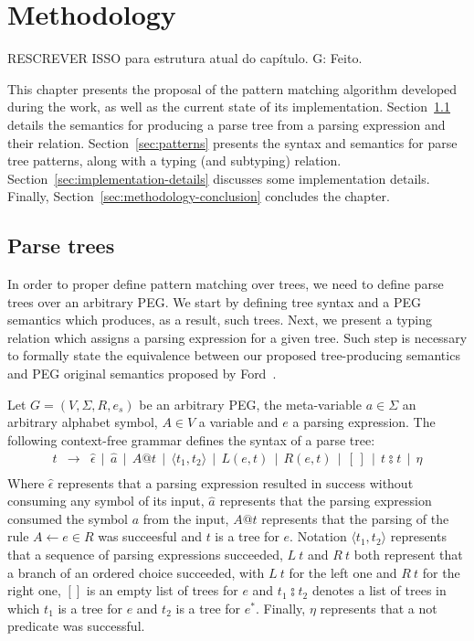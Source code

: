 \chapter{Methodology}\label{chap:methodology}

RESCREVER ISSO para estrutura atual do capítulo.
G: Feito.

This chapter presents the proposal of the pattern matching algorithm developed
during the work, as well as the  current state of its implementation.
Section~\ref{sec:parse-tress} details the semantics for producing a parse tree
from a parsing expression and their relation. Section~\ref{sec:patterns} presents 
the syntax and semantics for parse tree patterns, along with a typing (and subtyping)
relation. Section~\ref{sec:implementation-details} discusses some implementation
details. Finally, Section~\ref{sec:methodology-conclusion} concludes the chapter.

\section{Parse trees}\label{sec:parse-tress}

In order to proper define pattern matching over trees, we need
to define parse trees over an arbitrary PEG. We start by defining
tree syntax and a PEG semantics which produces, as a result, such
trees. Next, we present a typing relation which assigns a parsing
expression for a given tree. Such step is necessary to formally
state the equivalence between our proposed tree-producing semantics
and PEG original semantics proposed by Ford~\cite{ford2004-peg}.

Let \(G = (V, \Sigma, R, e_s)\) be an arbitrary PEG, the meta-variable \(a \in \Sigma\) an
arbitrary alphabet symbol, \(A \in V\) a variable and \(e\) a parsing expression.
The following context-free grammar defines the syntax of a parse tree:
\[
   \begin{array}{lcl}
      t & \to & \hat{\epsilon} \, \mid \, \hat{a} \, \mid \, A@t\,
                    \mid \, \langle t_1, t_2 \rangle\,
                    \mid \, L(e,t) \, \mid \, R(e,t) \, \mid \, [\,] \,\mid\,t \typecolon t\,
                    \mid \, \eta \\
   \end{array}
\]
Where \(\hat{\epsilon}\) represents that a parsing expression resulted in
success without consuming any symbol of its input, \(\hat{a}\) represents that
the parsing expression consumed the symbol \(a\) from the input, \(A@t\)
represents that the parsing of the rule \(A \leftarrow e \in R\) was succeesful
and $t$ is a tree for $e$. Notation
\(\langle t_1, t_2 \rangle\) represents that a sequence of parsing expressions
succeeded,
\(L \: t\) and \(R \: t\) both represent that a branch of an ordered choice succeeded,
with \(L \: t\) for the left one and \(R \: t\) for the right one,
\([]\) is an empty list of trees for $e$ and \(t_1  \typecolon  t_2\) denotes a list of
trees in which $t_1$ is a tree for $e$ and $t_2$ is a tree for $e^*$. Finally,
\(\eta\) represents that a not
predicate was successful.

